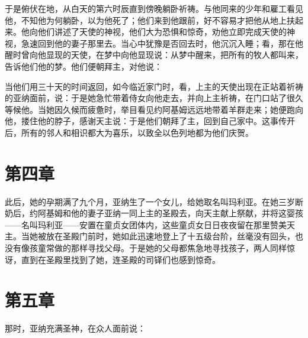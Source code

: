于是俯伏在地，从白天的第六时辰直到傍晚躺卧祈祷。与他同来的少年和雇工看见他，不知他为何躺卧，以为他死了；他们来到他跟前，好不容易才把他从地上扶起来。他向他们讲述了天使的神视，他们大为恐惧和惊奇，劝他立即完成天使的神视，急速回到他的妻子那里去。当心中犹豫是否回去时，他沉沉入睡；看，那在他醒时曾向他显现的天使，在梦中向他显现说：从梦中醒来，把所有的牧人都叫来，告诉他们他的梦。他们便朝拜主，对他说：\par

当他们用三十天的时间返回，如今临近家门时，看，上主的天使出现在正站着祈祷的亚纳面前，说：于是她急忙带着侍女向他走去，并向上主祈祷，在门口站了很久等候他。当她因久候而疲惫时，举目看见约阿基姆远远地带着羊群走来；她便跑向他，搂住他的脖子，感谢天主说：于是他们朝拜了主，回到自己家中。这事传开后，所有的邻人和相识都大为喜乐，以致全以色列地都为他们庆贺。\par


\section{第四章}

此后，她的孕期满了九个月，亚纳生了一个女儿，给她取名叫玛利亚。在她三岁断奶后，约阿基姆和他的妻子亚纳一同上主的圣殿去，向天主献上祭献，并将这婴孩——名叫玛利亚——安置在童贞女团体内，这些童贞女日日夜夜留在那里赞美天主。当她被放在圣殿门前时，她如此迅速地登上了十五级台阶，丝毫没有回头，也没有像孩童常做的那样寻找父母。于是她的父母都焦急地寻找孩子，两人同样惊讶，直到在圣殿里找到了她，连圣殿的司铎们也感到惊奇。\par


\section{第五章}

那时，亚纳充满圣神，在众人面前说：\par

